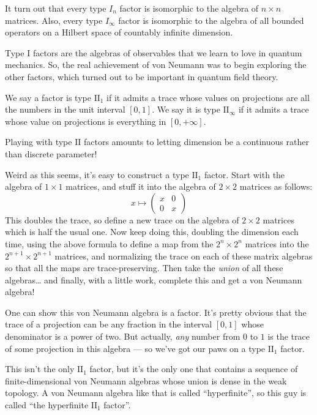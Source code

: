 \documentclass{article}
\begin{document}
It turn out that every type \(I_n\) factor is isomorphic to the algebra
of \(n\times n\) matrices. Also, every type \(I_\infty\) factor is
isomorphic to the algebra of all bounded operators on a Hilbert space of
countably infinite dimension.

Type \(\mathrm{I}\) factors are the algebras of observables that we
learn to love in quantum mechanics. So, the real achievement of von
Neumann was to begin exploring the other factors, which turned out to be
important in quantum field theory.

We say a factor is type \(\mathrm{II}_1\) if it admits a trace whose
values on projections are all the numbers in the unit interval
\([0,1]\). We say it is type \(\mathrm{II}_\infty\) if it admits a trace
whose value on projections is everything in \([0,+\infty]\).

Playing with type \(\mathrm{II}\) factors amounts to letting dimension
be a continuous rather than discrete parameter!

Weird as this seems, it's easy to construct a type \(\mathrm{II}_1\)
factor. Start with the algebra of \(1\times1\) matrices, and stuff it
into the algebra of \(2\times2\) matrices as follows:
\[x\mapsto\left(\begin{array}{cc}x&0\\0&x\end{array}\right)\] This
doubles the trace, so define a new trace on the algebra of \(2\times2\)
matrices which is half the usual one. Now keep doing this, doubling the
dimension each time, using the above formula to define a map from the
\(2^n\times2^n\) matrices into the \(2^{n+1}\times2^{n+1}\) matrices,
and normalizing the trace on each of these matrix algebras so that all
the maps are trace-preserving. Then take the \emph{union} of all these
algebras\ldots{} and finally, with a little work, complete this and get
a von Neumann algebra!

One can show this von Neumann algebra is a factor. It's pretty obvious
that the trace of a projection can be any fraction in the interval
\([0,1]\) whose denominator is a power of two. But actually, \emph{any}
number from \(0\) to \(1\) is the trace of some projection in this
algebra --- so we've got our paws on a type \(\mathrm{II}_1\) factor.

This isn't the only \(\mathrm{II}_1\) factor, but it's the only one that
contains a sequence of finite-dimensional von Neumann algebras whose
union is dense in the weak topology. A von Neumann algebra like that is
called ``hyperfinite'', so this guy is called ``the hyperfinite
\(\mathrm{II}_1\) factor''.
\end{document}

